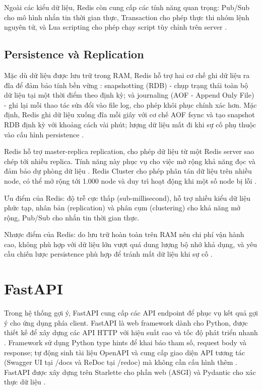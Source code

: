\documentclass[../BTL.tex]{subfiles}
\begin{document}
Ngoài các kiểu dữ liệu, Redis còn cung cấp các tính năng quan trọng: Pub/Sub cho mô hình nhắn tin thời gian thực, Transaction cho phép thực thi nhóm lệnh nguyên tử, và Lua scripting cho phép chạy script tùy chỉnh trên server \cite{redis_official,redis_wikipedia}.

\subsection{Persistence và Replication}
Mặc dù dữ liệu được lưu trữ trong RAM, Redis hỗ trợ hai cơ chế ghi dữ liệu ra đĩa để đảm bảo tính bền vững \cite{redis_wikipedia}: snapshotting (RDB) - chụp trạng thái toàn bộ dữ liệu tại một thời điểm theo định kỳ; và journaling (AOF - Append Only File) - ghi lại mỗi thao tác sửa đổi vào file log, cho phép khôi phục chính xác hơn. Mặc định, Redis ghi dữ liệu xuống đĩa mỗi giây với cơ chế AOF fsync và tạo snapshot RDB định kỳ với khoảng cách vài phút; lượng dữ liệu mất đi khi sự cố phụ thuộc vào cấu hình persistence \cite{redis_wikipedia}.

Redis hỗ trợ master-replica replication, cho phép dữ liệu từ một Redis server sao chép tới nhiều replica. Tính năng này phục vụ cho việc mở rộng khả năng đọc và đảm bảo dự phòng dữ liệu \cite{redis_wikipedia}. Redis Cluster cho phép phân tán dữ liệu trên nhiều node, có thể mở rộng tới 1.000 node và duy trì hoạt động khi một số node bị lỗi \cite{redis_wikipedia,redis_official}.

Ưu điểm của Redis: độ trễ cực thấp (sub-millisecond), hỗ trợ nhiều kiểu dữ liệu phức tạp, nhân bản (replication) và phân cụm (clustering) cho khả năng mở rộng, Pub/Sub cho nhắn tin thời gian thực.

Nhược điểm của Redis: do lưu trữ hoàn toàn trên RAM nên chi phí vận hành cao, không phù hợp với dữ liệu lớn vượt quá dung lượng bộ nhớ khả dụng, và yêu cầu chiến lược persistence phù hợp để tránh mất dữ liệu khi sự cố \cite{redis_wikipedia}.


\section{FastAPI}
Trong hệ thống gợi ý, FastAPI cung cấp các API endpoint để phục vụ kết quả gợi ý cho ứng dụng phía client. FastAPI là web framework dành cho Python, được thiết kế để xây dựng các API HTTP với hiệu suất cao và tốc độ phát triển nhanh \cite{fastapi_official}. Framework sử dụng Python type hints để khai báo tham số, request body và response; tự động sinh tài liệu OpenAPI và cung cấp giao diện API tương tác (Swagger UI tại /docs và ReDoc tại /redoc) mà không cần cấu hình thêm \cite{fastapi_official,fastapi_wikipedia}. FastAPI được xây dựng trên Starlette cho phần web (ASGI) và Pydantic cho xác thực dữ liệu \cite{fastapi_official}.
\end{document}
